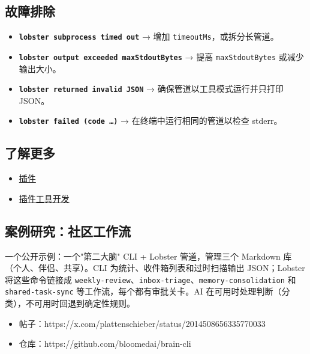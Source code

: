 \subsection{故障排除}


\begin{itemize}
  \item \textbf{\texttt{lobster subprocess timed out}} → 增加 \texttt{timeoutMs}，或拆分长管道。
  \item \textbf{\texttt{lobster output exceeded maxStdoutBytes}} → 提高 \texttt{maxStdoutBytes} 或减少输出大小。
  \item \textbf{\texttt{lobster returned invalid JSON}} → 确保管道以工具模式运行并只打印 JSON。
  \item \textbf{\texttt{lobster failed (code …)}} → 在终端中运行相同的管道以检查 stderr。
\end{itemize}


\subsection{了解更多}


\begin{itemize}
  \item \href{/tools/plugin}{插件}
  \item \href{/plugins/agent-tools}{插件工具开发}
\end{itemize}


\subsection{案例研究：社区工作流}


一个公开示例：一个"第二大脑" CLI + Lobster 管道，管理三个 Markdown 库（个人、伴侣、共享）。CLI 为统计、收件箱列表和过时扫描输出 JSON；Lobster 将这些命令链接成 \texttt{weekly-review}、\texttt{inbox-triage}、\texttt{memory-consolidation} 和 \texttt{shared-task-sync} 等工作流，每个都有审批关卡。AI 在可用时处理判断（分类），不可用时回退到确定性规则。

\begin{itemize}
  \item 帖子：https://x.com/plattenschieber/status/2014508656335770033
  \item 仓库：https://github.com/bloomedai/brain-cli
\end{itemize}



\clearpage

